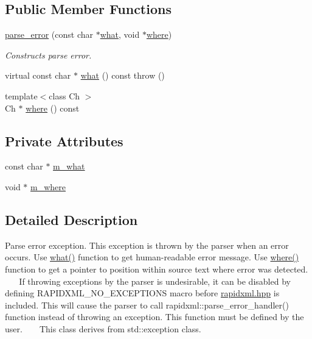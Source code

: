 \subsection*{Public Member Functions}
\begin{DoxyCompactItemize}
\item 
\hyperlink{classrapidxml_1_1parse__error_aea12a301271c393fb627b368fb9f35c1}{parse\+\_\+error} (const char $\ast$\hyperlink{classrapidxml_1_1parse__error_a7665c88639e7466ee1de388a4f85e6fe}{what}, void $\ast$\hyperlink{classrapidxml_1_1parse__error_a3a0ab9e586c1d2b437c340f6622fbec6}{where})
\begin{DoxyCompactList}\small\item\em Constructs parse error. \end{DoxyCompactList}\item 
virtual const char $\ast$ \hyperlink{classrapidxml_1_1parse__error_a7665c88639e7466ee1de388a4f85e6fe}{what} () const   throw ()
\item 
{\footnotesize template$<$class Ch $>$ }\\Ch $\ast$ \hyperlink{classrapidxml_1_1parse__error_a3a0ab9e586c1d2b437c340f6622fbec6}{where} () const 
\end{DoxyCompactItemize}
\subsection*{Private Attributes}
\begin{DoxyCompactItemize}
\item 
const char $\ast$ \hyperlink{classrapidxml_1_1parse__error_a41bffadc72eec238cf4b7d14c10c16ca}{m\+\_\+what}
\item 
void $\ast$ \hyperlink{classrapidxml_1_1parse__error_aa5a164653ac347adddf47b264620d80f}{m\+\_\+where}
\end{DoxyCompactItemize}


\subsection{Detailed Description}
Parse error exception. This exception is thrown by the parser when an error occurs. Use \hyperlink{classrapidxml_1_1parse__error_a7665c88639e7466ee1de388a4f85e6fe}{what()} function to get human-\/readable error message. Use \hyperlink{classrapidxml_1_1parse__error_a3a0ab9e586c1d2b437c340f6622fbec6}{where()} function to get a pointer to position within source text where error was detected. ~\newline
~\newline
 If throwing exceptions by the parser is undesirable, it can be disabled by defining R\+A\+P\+I\+D\+X\+M\+L\+\_\+\+N\+O\+\_\+\+E\+X\+C\+E\+P\+T\+I\+O\+N\+S macro before \hyperlink{rapidxml_8hpp}{rapidxml.\+hpp} is included. This will cause the parser to call rapidxml\+::parse\+\_\+error\+\_\+handler() function instead of throwing an exception. This function must be defined by the user. ~\newline
~\newline
 This class derives from {\ttfamily std\+::exception} class. 

